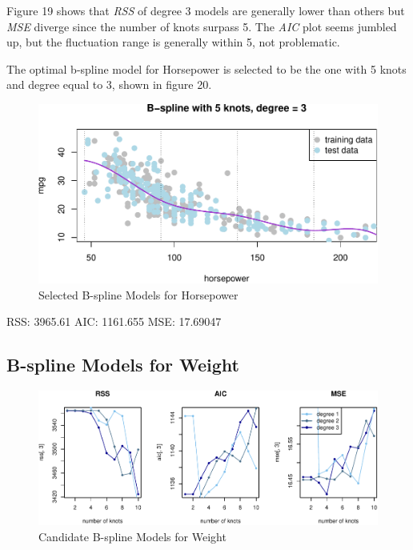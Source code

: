 \documentclass[]{article}
\begin{document}
Figure 19 shows that \emph{RSS} of degree 3 models are generally lower
than others but \emph{MSE} diverge since the number of knots surpass 5.
The \emph{AIC} plot seems jumbled up, but the fluctuation range is
generally within 5, not problematic.

The optimal b-spline model for Horsepower is selected to be the one with
5 knots and degree equal to 3, shown in figure 20.

\begin{figure}

{\centering \includegraphics{Report_files/figure-latex/bs-h-opt-1} 

}

\caption{Selected B-spline Models for Horsepower}\label{fig:bs-h-opt}
\end{figure}

RSS: 3965.61 AIC: 1161.655 MSE: 17.69047

\hypertarget{b-spline-models-for-weight}{%
\subsection{B-spline Models for
Weight}\label{b-spline-models-for-weight}}

\begin{figure}

{\centering \includegraphics{Report_files/figure-latex/bs-w-1} 

}

\caption{Candidate B-spline Models for Weight}\label{fig:bs-w}
\end{figure}
\end{document}
